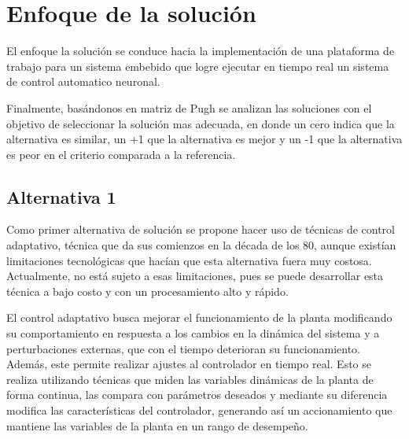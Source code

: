 \documentclass[12pt]{article}
\begin{document}
\section{Enfoque de la solución}

El enfoque la solución se conduce hacia la implementación de una plataforma de trabajo para un sistema embebido que logre ejecutar en tiempo real un sistema de control automatico neuronal.


Finalmente, basándonos en matriz de Pugh se analizan las soluciones con el objetivo de seleccionar la solución mas adecuada, en donde un cero indica que la alternativa es similar, un +1 que la alternativa es mejor y un -1 que la alternativa es peor en el criterio comparada a la referencia.

\subsection{Alternativa 1}

Como primer alternativa de solución se propone hacer uso de técnicas de control adaptativo, técnica que da sus comienzos en la década de los 80, aunque existían limitaciones tecnológicas que hacían que esta alternativa fuera muy costosa. Actualmente,
no está sujeto a esas limitaciones, pues se puede desarrollar esta técnica a bajo costo y con un procesamiento alto y rápido\cite{15_tec}.

El control adaptativo busca mejorar el funcionamiento de la planta modificando su comportamiento en respuesta a los cambios en la dinámica del sistema y a perturbaciones externas, que con el tiempo deterioran su funcionamiento. Además, este permite realizar ajustes al controlador en tiempo real. Esto se realiza utilizando técnicas que miden las variables dinámicas de la planta de forma continua, las compara con parámetros deseados y mediante su diferencia modifica las características del controlador, generando así un accionamiento que mantiene las variables de la planta en un rango de desempeño\cite{15_tec}.
\end{document}
